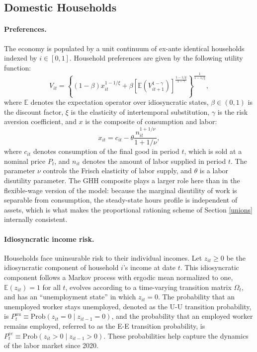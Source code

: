 \subsection{Domestic Households} \label{households_problem}

\paragraph{Preferences.} The economy is populated by a unit continuum of
ex-ante identical households indexed by $i\in[0,1]$. Household preferences are
given by the following \textcite{Epstein-Zin-89} utility function:
\begin{equation}\label{utility_function}
V_{it}= \left\{(1-\beta)x_{it}^{1-1/\xi} + \beta \left[\mathbb{E}\left( V_{it+1}^{1-\gamma}\right) \right]^{\frac{1-1/\xi}{1-\gamma}} \right\}^{\frac{1}{1-1/\xi}},
\end{equation}
where $\mathbb{E}$ denotes the expectation operator over idiosyncratic states,
$\beta\in(0,1)$ is the discount factor, $\xi$ is the elasticity of
intertemporal substitution, $\gamma$ is the risk aversion coefficient, and $x$
is the \textcite{Greenwood_Hercowitz_Huffman_1988} composite of consumption and
labor:
\begin{equation}\label{composite_c_n}
    x_{it} = c_{it} - \theta \frac{n_{it}^{1+1/\nu}}{1+1/\nu},
\end{equation}
where $c_{it}$ denotes consumption of the final good in period $t$, which is
sold at a nominal price $P_t$, and $n_{it}$ denotes the amount of labor supplied
in period $t$. The parameter $\nu$ controls the Frisch elasticity of labor
supply, and $\theta$ is a labor disutility parameter. The GHH composite plays a
larger role here than in the flexible-wage version of the model: because the
marginal disutility of work is separable from consumption, the steady-state
hours profile is independent of assets, which is what makes the proportional
rationing scheme of Section \ref{unions} internally consistent.

\paragraph{Idiosyncratic income risk.} Households face uninsurable risk to
their individual incomes. Let $z_{it}\geq 0$ be the idiosyncratic component of
household $i$'s income at date $t$. This idiosyncratic component follows a
Markov process with ergodic mean normalized to one, $\mathbb{E}(z_{it})=1$ for
all $t$, evolves according to a time-varying transition matrix $\Omega_t$, and
has an ``unemployment state'' in which $z_{it}=0$. The probability that an
unemployed worker stays unemployed, denoted as the U-U transition probability,
is $P^{uu}_t \equiv \text{Prob}(z_{it}=0\mid z_{it-1}=0)$, and the probability
that an employed worker remains employed, referred to as the E-E transition
probability, is $P^{ee}_t \equiv \text{Prob}(z_{it}>0\mid z_{it-1}>0)$. These
probabilities help capture the dynamics of the labor market since 2020.

